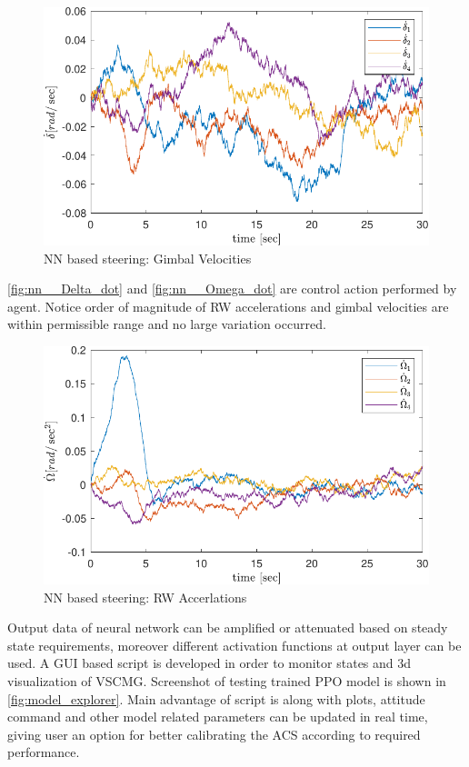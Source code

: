 \begin{figure}[H]
    \centering
    \includegraphics[width=\textwidth]{figures/plots/RL/nn_Delta_dot.pdf}
    \caption{NN based steering: Gimbal Velocities}
    \label{fig:nn__Delta_dot}
\end{figure}
\noindent \autoref{fig:nn__Delta_dot} and \autoref{fig:nn__Omega_dot} are control action performed by agent. Notice order of magnitude of RW accelerations and gimbal velocities are within permissible range and no large variation occurred.
\begin{figure}[H]
    \centering
    \includegraphics[width=\textwidth]{figures/plots/RL/nn_Omega_dot.pdf}
    \caption{NN based steering: RW Accerlations}
    \label{fig:nn__Omega_dot}
\end{figure}
\noindent Output data of neural network can be amplified or attenuated based on steady state requirements, moreover different activation functions at output layer can be used. A GUI based script is developed in order to monitor states and 3d visualization of VSCMG. Screenshot of testing trained PPO model is shown in \autoref{fig:model_explorer}. Main advantage of script is along with plots, attitude command and other model related parameters can be updated in real time, giving user an option for better calibrating the ACS according to required performance. 
